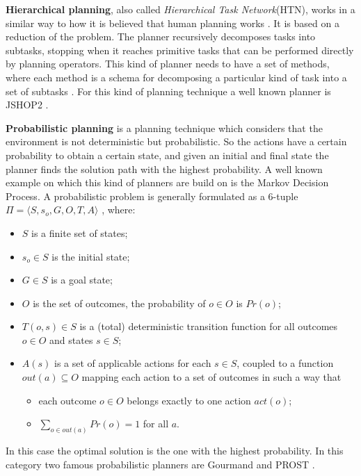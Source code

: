 \textbf{Hierarchical planning}, also called \textit{Hierarchical Task Network}(HTN), works in a similar way to how it is believed that human planning 
works \citep{marthi2007angelic}. It is based on a reduction of the problem. The planner recursively decomposes tasks into subtasks, stopping when it reaches primitive tasks that can be performed directly by planning operators. This kind of planner needs to have a set of methods, where each method is a schema for decomposing a particular kind of task into a set of subtasks \citep{shopDescription}. For this kind of planning technique a well known planner is JSHOP2 \cite{JSHOP2}.

\textbf{Probabilistic planning} is a planning technique which considers that the environment is not deterministic but probabilistic. So the actions have a certain probability to obtain a certain state, and given an initial and final state the planner  finds the solution path with the highest probability. A well known example on which this kind of planners are build on is the Markov Decision Process. A probabilistic problem is generally formulated as a $6$-tuple $\Pi=\langle S, s_o, G, O, T, A \rangle$ \cite{little2007probabilistic}, where:
\begin{itemize}
\item $S$ is a finite set of states;
\item $s_o \in S$ is the initial state;
\item $G \in S$ is a goal state;
\item $O$ is the set of outcomes, the probability of $o \in O$ is $Pr(o)$;
\item $T(o,s) \in S$ is a (total) deterministic transition function for all outcomes $o \in O$ and states $s\in S$;
\item $A(s)$ is a set of applicable actions for each $s \in S$, coupled to a function $out(a) \subseteq O$ mapping each action to a set of outcomes in such a way that 
\begin{itemize}
\item each outcome $o \in O$ belongs exactly to one action $act(o)$;
\item $\sum_{o \in out(a)} Pr(o) = 1$ for all $a$.
\end{itemize}
\end{itemize}
In this case the optimal solution is the one with the highest probability. In this category two famous probabilistic planners are Gourmand \cite{Gourmand} and PROST \cite{PROST}.


